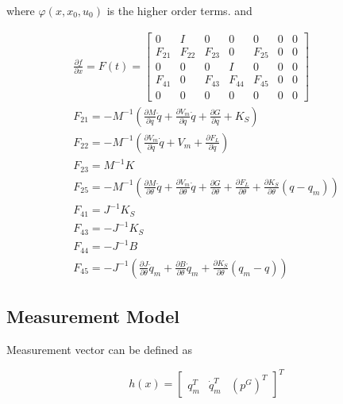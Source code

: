 \documentclass[conference]{IEEEtran}
\begin{document}
where $\varphi (x,{x_0},{u_0})$ is the higher order terms. and

\begin{equation}
\begin{array}{ccccc}
\frac{{\partial f}}{{\partial x}} = F(t) = \left[ {\begin{array}{*{20}{c}}
0&I&0&0&0&0&0\\
{{F_{21}}}&{{F_{22}}}&{{F_{23}}}&0&{{F_{25}}}&0&0\\
0&0&0&I&0&0&0\\
{{F_{41}}}&0&{{F_{43}}}&{{F_{44}}}&{{F_{45}}}&0&0\\
0&0&0&0&0&0&0
\end{array}} \right]\\
{F_{21}} =  - {M^{ - 1}}(\frac{{\partial M}}{{\partial q}}\ddot q + \frac{{\partial {V_m}}}{{\partial q}}\dot q + \frac{{\partial G}}{{\partial q}} + {K_S})\\
{F_{22}} =  - {M^{ - 1}}(\frac{{\partial {V_m}}}{{\partial \dot q}}\dot q + {V_m} + \frac{{\partial {F_L}}}{{\partial \dot q}})\\
{F_{23}} = {M^{ - 1}}K\\
{F_{25}} =  - {M^{ - 1}}(\frac{{\partial M}}{{\partial \theta }}\ddot q + \frac{{\partial {V_m}}}{{\partial \theta }}\dot q + \frac{{\partial G}}{{\partial \theta }} + \frac{{\partial {F_L}}}{{\partial \theta }} + \frac{{\partial {K_S}}}{{\partial \theta }}(q - {q_m}))\\
{F_{41}} = {J^{ - 1}}{K_S}\\
{F_{43}} =  - {J^{ - 1}}{K_S}\\
{F_{44}} =  - {J^{ - 1}}B\\
{F_{45}} =  - {J^{ - 1}}(\frac{{\partial J}}{{\partial \theta }}{{\ddot q}_m} + \frac{{\partial B}}{{\partial \theta }}{{\dot q}_m} + \frac{{\partial {K_S}}}{{\partial \theta }}({q_m} - q))
\end{array}
\label{10}
\end{equation}

\subsection{Measurement Model}
Measurement vector can be defined as


\begin{equation}
h(x) = {[\begin{array}{*{20}{c}}
{q_m^T}&{\dot q_m^T}&{{{({p^G})}^T}}
\end{array}]^T}
\label{12}
\end{equation}
\end{document}

